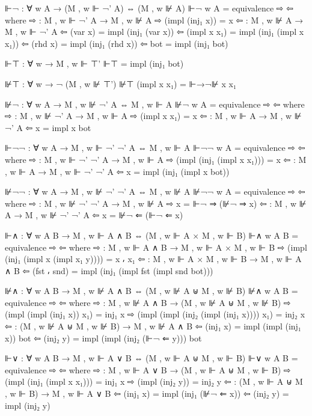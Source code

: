 \begin{spverbatim}
    ⊩¬ : ∀  {w A} → (M , w ⊩ ¬' A) ⇔ (M , w ⊮ A)
    ⊩¬ {w} {A} = equivalence ⇨ ⇦
      where ⇨ : M , w ⊩ ¬' A → M , w ⊮ A
            ⇨ (impl (inj₁ x)) = x
            ⇦ : M , w ⊮ A → M , w ⊩ ¬' A
            ⇦ (var x) = impl (inj₁ (var x))
            ⇦ (impl x x₁) = impl (inj₁ (impl x x₁))
            ⇦ (rhd x) = impl (inj₁ (rhd x))
            ⇦ bot = impl (inj₁ bot)

    ⊩⊤ : ∀ {w} → M , w ⊩ ⊤'
    ⊩⊤ = impl (inj₁ bot)

    ⊮⊤ : ∀ {w} → ¬ (M , w ⊮ ⊤')
    ⊮⊤ (impl x x₁) = ⊩→¬⊮ x x₁

    ⊮¬ : ∀ {w A} → M , w ⊮ ¬' A ⇔ M , w ⊩ A
    ⊮¬ {w} {A} = equivalence ⇨ ⇦
      where
        ⇨ : M , w ⊮ ¬' A → M , w ⊩ A
        ⇨ (impl x x₁) = x
        ⇦ : M , w ⊩ A → M , w ⊮ ¬' A
        ⇦ x = impl x bot

    ⊩¬¬ : ∀ {w A} → M , w ⊩ ¬' ¬' A ⇔ M , w ⊩ A
    ⊩¬¬ {w} {A} = equivalence ⇨ ⇦
      where
      ⇨ : M , w ⊩ ¬' ¬' A → M , w ⊩ A
      ⇨ (impl (inj₁ (impl x x₁))) = x
      ⇦ : M , w ⊩ A → M , w ⊩ ¬' ¬' A
      ⇦ x = impl (inj₁ (impl x bot))

    ⊮¬¬ : ∀  {w A} → M , w ⊮ ¬' ¬' A ⇔ M , w ⊮ A
    ⊮¬¬ {w} {A} = equivalence ⇨ ⇦
      where
      ⇨ : M , w ⊮ ¬' ¬' A → M , w ⊮ A
      ⇨ x = ⊩¬ ⇒ (⊮¬ ⇒ x)
      ⇦ : M , w ⊮ A → M , w ⊮ ¬' ¬' A
      ⇦ x = ⊮¬ ⇐ (⊩¬ ⇐ x)

    ⊩∧ : ∀ {w A B} → M , w ⊩ A ∧ B ⇔ (M , w ⊩ A × M , w ⊩ B)
    ⊩∧ {w} {A} {B} = equivalence ⇨ ⇦
      where
      ⇨ : M , w ⊩ A ∧ B → M , w ⊩ A × M , w ⊩ B
      ⇨ (impl (inj₁ (impl x (impl x₁ y)))) = x ⸴ x₁
      ⇦ : M , w ⊩ A × M , w ⊩ B → M , w ⊩ A ∧ B
      ⇦ (fst ⸴ snd) = impl (inj₁ (impl fst (impl snd bot)))

    ⊮∧ : ∀ {w A B} → M , w ⊮ A ∧ B ⇔ (M , w ⊮ A ⊎ M , w ⊮ B)
    ⊮∧ {w} {A} {B} = equivalence ⇨ ⇦
      where
      ⇨ : M , w ⊮ A ∧ B → (M , w ⊮ A ⊎ M , w ⊮ B)
      ⇨ (impl (impl (inj₁ x)) x₁) = inj₁ x
      ⇨ (impl (impl (inj₂ (impl (inj₁ x)))) x₁) = inj₂ x
      ⇦ : (M , w ⊮ A ⊎ M , w ⊮ B) → M , w ⊮ A ∧ B
      ⇦ (inj₁ x) = impl (impl (inj₁ x)) bot
      ⇦ (inj₂ y) = impl (impl (inj₂ (⊩¬ ⇐ y))) bot

    ⊩∨ : ∀ {w A B} → M , w ⊩ A ∨ B ⇔ (M , w ⊩ A ⊎ M , w ⊩ B)
    ⊩∨ {w} {A} {B} = equivalence ⇨ ⇦
      where
      ⇨ : M , w ⊩ A ∨ B → (M , w ⊩ A ⊎ M , w ⊩ B)
      ⇨ (impl (inj₁ (impl x x₁))) = inj₁ x
      ⇨ (impl (inj₂ y)) = inj₂ y
      ⇦ : (M , w ⊩ A ⊎ M , w ⊩ B) → M , w ⊩ A ∨ B
      ⇦ (inj₁ x) = impl (inj₁ (⊮¬ ⇐ x))
      ⇦ (inj₂ y) = impl (inj₂ y)


\end{spverbatim}
